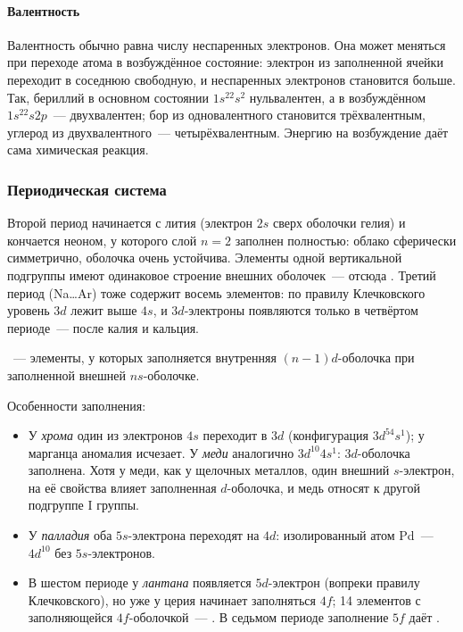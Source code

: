 \paragraph{Валентность}
Валентность обычно равна числу неспаренных электронов. Она может
меняться при переходе атома в возбуждённое состояние: электрон из
заполненной ячейки переходит в соседнюю свободную, и неспаренных
электронов становится больше. Так, бериллий в основном состоянии
$1s^22s^2$ нульвалентен, а в возбуждённом $1s^22s2p$~— двухвалентен;
бор из одновалентного становится трёхвалентным, углерод из
двухвалентного~— четырёхвалентным. Энергию на возбуждение даёт сама
химическая реакция.

\subsubsection{Периодическая система}

Второй период начинается с лития (электрон $2s$ сверх оболочки гелия)
и кончается неоном, у которого слой $n=2$ заполнен полностью: облако
сферически симметрично, оболочка очень устойчива. Элементы одной
вертикальной подгруппы имеют одинаковое строение внешних оболочек~—
отсюда . Третий период (Na\ldots Ar) тоже содержит
восемь элементов: по правилу Клечковского уровень $3d$ лежит выше $4s$, и
$3d$-электроны появляются только в четвёртом периоде~— после калия и
кальция.

\begin{opredelenie}
~— элементы, у которых заполняется внутренняя
$(n-1)d$-оболочка при заполненной внешней $ns$-оболочке.
\end{opredelenie}

Особенности заполнения:
\begin{itemize}
\item У \emph{хрома} один из электронов $4s$ переходит в $3d$
(конфигурация $3d^54s^1$); у марганца аномалия исчезает. У \emph{меди}
аналогично $3d^{10}4s^1$: $3d$-оболочка заполнена. Хотя у меди, как у
щелочных металлов, один внешний $s$-электрон, на её свойства влияет
заполненная $d$-оболочка, и медь относят к другой подгруппе I группы.
\item У \emph{палладия} оба $5s$-электрона переходят на $4d$: изолированный
атом Pd~— $4d^{10}$ без $5s$-электронов.
\item В шестом периоде у \emph{лантана} появляется $5d$-электрон (вопреки
правилу Клечковского), но уже у церия начинает заполняться $4f$; 14
элементов с заполняющейся $4f$-оболочкой~— . В седьмом
периоде заполнение $5f$ даёт .
\end{itemize}

